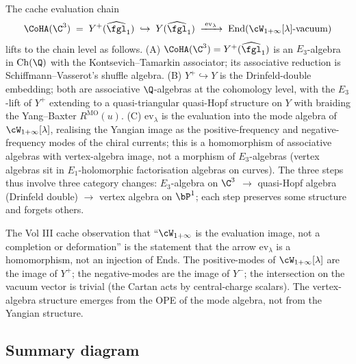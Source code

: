 \begin{remark}
\label{rem:evaluation-chain-wave10-final}
The cache evaluation chain
\[
 \CoHA(\C^3) \;=\; Y^+(\widehat{\fgl}_1)
 \;\hookrightarrow\; Y(\widehat{\fgl}_1)
 \;\xrightarrow{\;\mathrm{ev}_\lambda\;}\;
 \mathrm{End}(\cW_{1+\infty}[\lambda]\text{-vacuum})
\]
lifts to the chain level as follows. (A) $\CoHA(\C^3) = Y^+(\widehat{\fgl}_1)$
is an $E_3$-algebra in $\mathrm{Ch}(\Q)$ with the Kontsevich--Tamarkin
associator; its associative reduction is Schiffmann--Vasserot's
shuffle algebra. (B) $Y^+ \hookrightarrow Y$ is the Drinfeld-double
embedding; both are associative $\Q$-algebras at the cohomology level,
with the $E_3$-lift of $Y^+$ extending to a quasi-triangular
quasi-Hopf structure on $Y$ with braiding the Yang--Baxter $R^{\mathrm{MO}}(u)$.
(C) $\mathrm{ev}_\lambda$ is the evaluation into the mode algebra
of $\cW_{1+\infty}[\lambda]$, realising the Yangian image as the
positive-frequency and negative-frequency modes of the chiral
currents; this is a homomorphism of associative algebras with vertex-algebra
image, not a morphism of $E_3$-algebras (vertex algebras sit in
$E_1$-holomorphic factorisation algebras on curves). The three steps
thus involve three category changes: $E_3$-algebra on $\C^3$ $\to$
quasi-Hopf algebra (Drinfeld double) $\to$ vertex algebra on $\bP^1$;
each step preserves some structure and forgets others.

The Vol III cache observation that ``$\cW_{1+\infty}$ is the evaluation
image, not a completion or deformation'' is the statement that the
arrow $\mathrm{ev}_\lambda$ is a homomorphism, not an injection of
$\mathrm{End}$s. The positive-modes of $\cW_{1+\infty}[\lambda]$ are
the image of $Y^+$; the negative-modes are the image of $Y^-$; the
intersection on the vacuum vector is trivial (the Cartan acts by
central-charge scalars). The vertex-algebra structure emerges from
the OPE of the mode algebra, not from the Yangian structure.
\end{remark}

\subsection*{Summary diagram}

